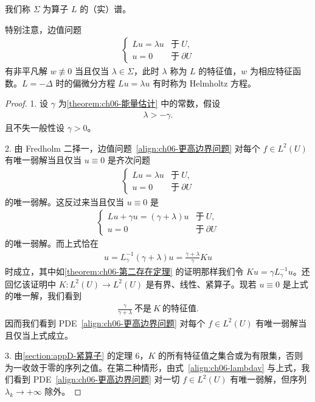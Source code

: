 \documentclass[../../main.tex]{subfiles}
\begin{document}
\begin{definition}\label{definition:ch06-谱}
我们称 $\Sigma$ 为算子 $L$ 的（实）谱。
\end{definition}

特别注意，边值问题
\begin{align*}
\begin{cases}
Lu=\lambda u & \text{于}\ U,\\
u=0 & \text{于}\ \partial U
\end{cases}
\end{align*}
有非平凡解 $w\not\equiv 0$ 当且仅当 $\lambda\in\Sigma$，此时 $\lambda$ 称为 $L$ 的特征值，$w$ 为相应特征函数。$L=-\Delta$ 时的偏微分方程 $Lu=\lambda u$ 有时称为 Helmholtz 方程。

\begin{proof}
1. 设 $\gamma$ 为\cref{theorem:ch06-能量估计} 中的常数，假设
\begin{align}
\lambda>-\gamma.
\end{align}
且不失一般性设 $\gamma>0$。

2. 由 Fredholm 二择一，边值问题~\eqref{align:ch06-更高边界问题} 对每个 $f\in L^{2}(U)$ 有唯一弱解当且仅当 $u\equiv 0$ 是齐次问题
\begin{align*}
\begin{cases}
Lu=\lambda u & \text{于}\ U,\\
u=0 & \text{于}\ \partial U
\end{cases}
\end{align*}
的唯一弱解。这反过来当且仅当 $u\equiv 0$ 是
\begin{align}
\begin{cases}
Lu+\gamma u=(\gamma+\lambda)u & \text{于}\ U,\\
u=0 & \text{于}\ \partial U
\end{cases}
\end{align}
的唯一弱解。而上式恰在
\begin{align}
u=L_{\gamma}^{-1}(\gamma+\lambda)u=\frac{\gamma+\lambda}{\gamma}Ku
\end{align}
时成立，其中如\cref{theorem:ch06-第二存在定理} 的证明那样我们令 $Ku=\gamma L_{\gamma}^{-1}u$。还回忆该证明中 $K:L^{2}(U)\to L^{2}(U)$ 是有界、线性、紧算子。现若 $u\equiv 0$ 是上式的唯一解，我们看到
\begin{align}
\frac{\gamma}{\gamma+\lambda}\ \text{不是}\ K\ \text{的特征值}.
\end{align}
因而我们看到 PDE~\eqref{align:ch06-更高边界问题} 对每个 $f\in L^{2}(U)$ 有唯一弱解当且仅当上式成立。

3. 由\cref{section:appD-紧算子} 的定理 6，$K$ 的所有特征值之集合或为有限集，否则为一收敛于零的序列之值。在第二种情形，由式~\eqref{align:ch06-lambdav} 与上式，我们看到 PDE~\eqref{align:ch06-更高边界问题} 对一切 $f\in L^{2}(U)$ 有唯一弱解，但序列 $\lambda_{k}\to+\infty$ 除外。
\end{proof}
\end{document}
